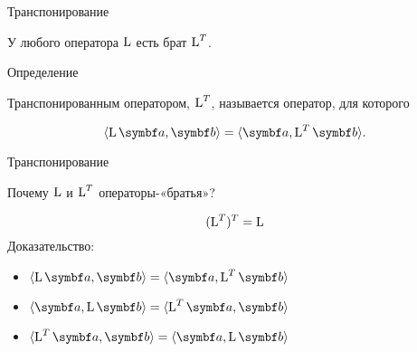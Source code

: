 

\begin{frame} %


\end{frame}

\begin{frame}{Транспонирование}

У любого оператора $\operatorname{L}$ есть брат $\operatorname{L}^T$.

\begin{block}{Определение} 
    
\alert{Транспонированным оператором}, $\operatorname{L}^T$, называется оператор, для которого

\[
    \langle \LL \ba, \bb\rangle = \langle \ba, \LL^T \bb\rangle.
\]
\end{block}
    

\end{frame}



\begin{frame}{Транспонирование}


Почему $\operatorname{L}$ и $\operatorname{L}^T$ операторы-«братья»?

\pause
\[
    (\operatorname{L}^T)^T = \operatorname{L}    
\]
\pause
Доказательство:

\pause

\begin{itemize}[<+->]
    \item $\langle \LL \ba , \bb \rangle = \langle  \ba , \LL^T \bb \rangle$  
    
    \item $\langle \ba , \LL \bb \rangle = \langle \LL^T \ba,  \bb \rangle$  

    \item $\langle \LL^T \ba,  \bb \rangle = \langle \ba , \LL \bb \rangle$  

\end{itemize}


\end{frame}




